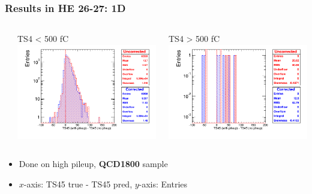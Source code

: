 \documentclass[bigger]{beamer}
\providecommand{\alert}[1]{\textbf{#1}}
\begin{document}
\begin{frame}
\frametitle{Results in HE 26-27: 1D}
\label{sec-3-3-20}
\begin{columns} %
\label{sec-3-3-20-1}
\begin{column}{0.55\textwidth}
\label{sec-3-3-20-1-1}

\centering
TS4 < 500 fC
\includegraphics[width=\textwidth]{fig/correction_comparison_1D_sample1800_under500_ring4.png}
\end{column}
\begin{column}{0.55\textwidth}
\label{sec-3-3-20-1-2}

\centering
TS4 > 500 fC
\includegraphics[width=\textwidth]{fig/correction_comparison_1D_sample1800_over500_ring4.png}
\end{column}
\end{columns}
\label{sec-3-3-20-2}
\begin{itemize}

\item Done on high pileup, \alert{QCD1800} sample
\label{sec-3-3-20-2-1}%

\item $x$-axis: TS45 true - TS45 pred, $y$-axis: Entries
\label{sec-3-3-20-2-2}%
\end{itemize} %
\end{frame}
\end{document}
